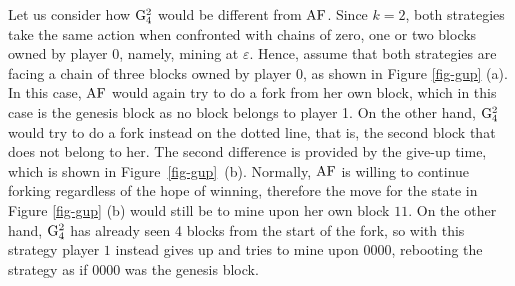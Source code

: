\begin{example}
Let us consider how ${\rm {G}}_4^2$ would be different from $\text{\rm AF}$. Since $k = 2$, both strategies take the same action when confronted with chains of zero, one or two blocks owned by player $0$, namely, mining at $\varepsilon$. Hence, assume that both strategies are facing a chain of three 
blocks owned by player 0, 
as shown in Figure \ref{fig-gup} (a). In this case, $\text{\rm AF}$ would again try to do a fork from her own block, which in this case is the genesis block as no block belongs to player 1. On the other hand, ${\rm {G}}_4^2$ would try to do a fork instead on the dotted line, that is, the second block that does not belong to her.
The second difference is provided by the give-up time, which is shown in Figure~\ref{fig-gup}~(b). Normally, $\text{\rm AF}$ is willing to continue forking regardless of the hope of winning, therefore the move for the state in Figure \ref{fig-gup} (b) would still be to mine upon her own block $11$. On the other hand, ${\rm {G}}_4^2$ has already seen 4 blocks from the start of the fork, so with this strategy player $1$ instead gives up and tries to mine upon $0000$, rebooting the strategy as if 
$0000$ was the genesis block. 
\end{example}

